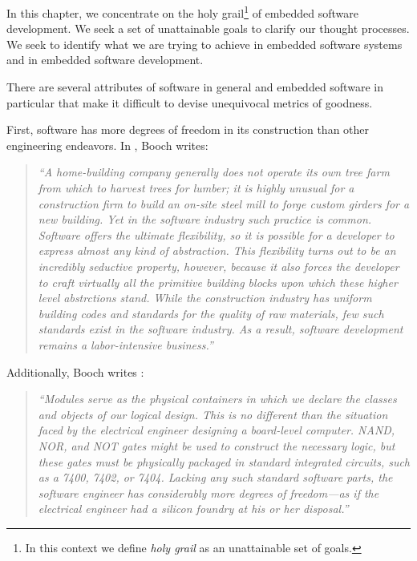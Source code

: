In this chapter, we concentrate on the holy grail\footnote{In this context
we define \emph{holy grail} as an unattainable set of goals.}
of embedded software development.  We seek a set of unattainable
goals to clarify our thought processes.  We seek to identify what we are
trying to achieve in embedded software systems and in embedded software development.

There are several attributes of software in general and embedded
software in particular that make it difficult to devise unequivocal
metrics of goodness.

First, software has more degrees of freedom in its construction
than other engineering endeavors.
In \cite[p. 6]{bibref:b:boochoodwithapps}, Booch  writes:

\begin{quote}
\emph{``A home-building
company generally does not operate its own tree farm from which to harvest trees
for lumber; it is highly unusual for a construction firm to build an
on-site steel mill to forge custom girders for a new building.  Yet in the
software industry such practice is common.  Software offers the ultimate
flexibility, so it is possible for a developer to express almost any kind
of abstraction.  This flexibility turns out to be an incredibly seductive
property, however, because it also forces the developer to craft virtually
all the primitive building blocks upon which these higher level abstrctions
stand.  While the construction industry has uniform building codes and 
standards for the quality of raw materials, few such standards exist in the
software industry.  As a result, software development remains a labor-intensive
business.''}
\end{quote}

Additionally,  Booch writes \cite[p. 51]{bibref:b:boochoodwithapps}:

\begin{quote}
\emph{``Modules serve as the physical containers in which we declare the classes and
objects of our logical design.  This is no different than the situation faced
by the electrical engineer designing a board-level computer.  NAND, NOR, and 
NOT gates might be used to construct the necessary logic, but these gates
must be physically packaged in standard integrated circuits, such as a 7400,
7402, or 7404.  Lacking any such standard software parts, the software engineer
has considerably more degrees of freedom---as if the electrical engineer had
a silicon foundry at his or her disposal.''}
\end{quote}


